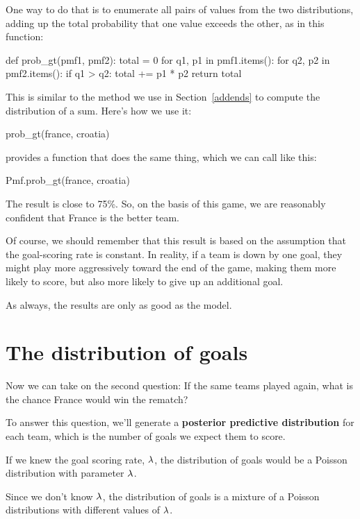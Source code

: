 \documentclass[12pt]{book}
\theoremstyle{exercise}
\begin{document}
One way to do that is to enumerate all pairs of values from the two distributions, adding up the total probability that one value exceeds the other, as in this function:

\begin{code}
def prob_gt(pmf1, pmf2):
    total = 0
    for q1, p1 in pmf1.items():
        for q2, p2 in pmf2.items():
            if q1 > q2:
                total += p1 * p2
    return total
\end{code}

This is similar to the method we use in Section~\ref{addends} to compute the distribution of a sum.
Here's how we use it:

\begin{code}
prob_gt(france, croatia)
\end{code}

 provides a function that does the same thing, which we can call like this:

\begin{code}
Pmf.prob_gt(france, croatia)
\end{code}

The result is close to 75\%.  So, on the basis of this game, we are reasonably confident that France is the better team.

Of course, we should remember that this result is based on the assumption that the goal-scoring rate is constant.
In reality, if a team is down by one goal, they might play more aggressively toward the end of the game, making them more likely to score, but also more likely to give up an additional goal.

As always, the results are only as good as the model.


\section{The distribution of goals}

Now we can take on the second question: If the same teams played again, what is the chance France would win the rematch?

To answer this question, we'll generate a {\bf posterior predictive distribution} for each team, which is the number of goals we expect them to score.

If we knew the goal scoring rate, $\mathtt{\lambda}$, the distribution of goals would be a Poisson distribution with parameter $\mathtt{\lambda}$.

Since we don't know $\mathtt{\lambda}$, the distribution of goals is a mixture of a Poisson distributions with different values of $\mathtt{\lambda}$.
\end{document}
